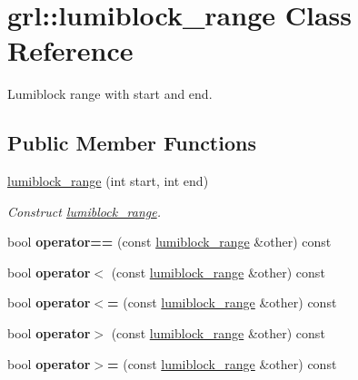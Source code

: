 \hypertarget{classgrl_1_1lumiblock__range}{}\section{grl\+:\+:lumiblock\+\_\+range Class Reference}
\label{classgrl_1_1lumiblock__range}


Lumiblock range with start and end.  


\subsection*{Public Member Functions}
\begin{DoxyCompactItemize}
\item 
\mbox{\label{classgrl_1_1lumiblock__range_af492b3d5c2f3d9a3c5ef8fd533e78029}} 
\mbox{\hyperlink{classgrl_1_1lumiblock__range_af492b3d5c2f3d9a3c5ef8fd533e78029}{lumiblock\+\_\+range}} (int start, int end)
\begin{DoxyCompactList}\small\item\em Construct \mbox{\hyperlink{classgrl_1_1lumiblock__range}{lumiblock\+\_\+range}}. \end{DoxyCompactList}\item 
\mbox{\label{classgrl_1_1lumiblock__range_a868adf1ea3ae5ece06fc67c3866c4099}} 
bool {\bfseries operator==} (const \mbox{\hyperlink{classgrl_1_1lumiblock__range}{lumiblock\+\_\+range}} \&other) const
\item 
\mbox{\label{classgrl_1_1lumiblock__range_ac0a4a3fd5f6b6a810ba599c206f943d8}} 
bool {\bfseries operator$<$} (const \mbox{\hyperlink{classgrl_1_1lumiblock__range}{lumiblock\+\_\+range}} \&other) const
\item 
\mbox{\label{classgrl_1_1lumiblock__range_a099e16789060cb0a6dd2ebf1f4f8b0c4}} 
bool {\bfseries operator$<$=} (const \mbox{\hyperlink{classgrl_1_1lumiblock__range}{lumiblock\+\_\+range}} \&other) const
\item 
\mbox{\label{classgrl_1_1lumiblock__range_afdbb6d9a705f18bb5ced0ce8af78d0c7}} 
bool {\bfseries operator$>$} (const \mbox{\hyperlink{classgrl_1_1lumiblock__range}{lumiblock\+\_\+range}} \&other) const
\item 
\mbox{\label{classgrl_1_1lumiblock__range_a44a56fef61482fe166cad05e5538fd2b}} 
bool {\bfseries operator$>$=} (const \mbox{\hyperlink{classgrl_1_1lumiblock__range}{lumiblock\+\_\+range}} \&other) const
\end{DoxyCompactItemize}
